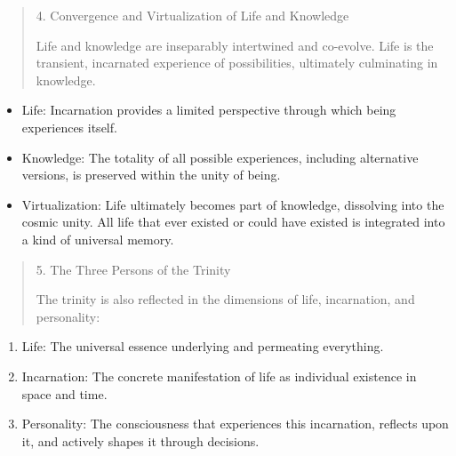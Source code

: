 \documentclass[
  ngerman,
]{article}
\begin{document}
\begin{quote}
4. Convergence and Virtualization of Life and Knowledge

Life and knowledge are inseparably intertwined and co-evolve. Life is
the transient, incarnated experience of possibilities, ultimately
culminating in knowledge.
\end{quote}

\begin{itemize}
\item
  Life: Incarnation provides a limited perspective through which being
  experiences itself.
\item
  Knowledge: The totality of all possible experiences, including
  alternative versions, is preserved within the unity of being.
\item
  Virtualization: Life ultimately becomes part of knowledge, dissolving
  into the cosmic unity. All life that ever existed or could have
  existed is integrated into a kind of universal memory.
\end{itemize}

\begin{quote}
5. The Three Persons of the Trinity

The trinity is also reflected in the dimensions of life, incarnation,
and personality:
\end{quote}

\begin{enumerate}
\def\labelenumi{\arabic{enumi}.}
\item
  Life: The universal essence underlying and permeating everything.
\item
  Incarnation: The concrete manifestation of life as individual
  existence in space and time.
\item
  Personality: The consciousness that experiences this incarnation,
  reflects upon it, and actively shapes it through decisions.
\end{enumerate}
\end{document}
